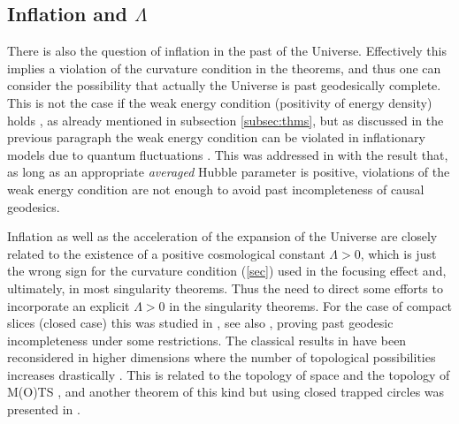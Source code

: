 \documentclass[12pt]{iopart}
\begin{document}
\subsection{Inflation and $\Lambda$}
There is also the question of inflation in the past of the Universe. Effectively this implies a violation of the curvature condition in the theorems, and thus one can consider the possibility that actually the Universe is past geodesically complete. This is not the case if the weak energy condition (positivity of energy density) holds \cite{Bor2,BV,BV2}, as already mentioned in subsection \ref{subsec:thms}, but as discussed in the previous paragraph the weak energy condition can be violated in inflationary models due to quantum fluctuations \cite{BV3}. This was addressed in \cite{BGV} with the result that, as long as an appropriate {\em averaged} Hubble parameter is positive, violations of the weak energy condition are not enough to avoid past incompleteness of causal geodesics.

Inflation as well as the acceleration of the expansion of the Universe are closely related to the existence of a positive cosmological constant $\Lambda >0$, which is just the wrong sign for the curvature condition (\ref{sec}) used in the focusing effect and, ultimately, in most singularity theorems. Thus the need to direct some efforts to incorporate an explicit $\Lambda >0$ in the singularity theorems. For the case of compact slices (closed case) this was studied in  \cite{Gal}, see also \cite{AnG}, proving past geodesic incompleteness under some restrictions. The classical results in \cite{Gan,Gan2,Lee} have been reconsidered in higher dimensions where the number of topological possibilities increases drastically \cite{CeS}. This is related to the topology of space \cite{CG} and the topology of M(O)TS \cite{H4,GaSc,Gal2}, and another theorem of this kind but using closed trapped circles was presented in \cite{GaS}. 
\end{document}
